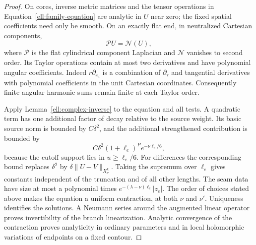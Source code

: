 \begin{proof}
On cores, inverse metric matrices and the tensor operations in
Equation~\eqref{ell:family-equation} are analytic in $U$ near zero;
the fixed spatial coefficients need only be smooth.  On an
exactly flat end, in neutralized Cartesian components,
\begin{equation}
                   \mathcal P U=\mathcal N(U),
 \label{ell:flat-equation}
\end{equation}
where $\mathcal P$ is the flat cylindrical component Laplacian
and $\mathcal N$ vanishes to second order.  Its Taylor operations
contain at most two derivatives and have polynomial angular
coefficients.  Indeed $r\partial_{x_i}$ is a combination of
$\partial_\tau$ and tangential derivatives with polynomial
coefficients in the unit Cartesian coordinates.  Consequently
finite angular harmonic sums remain finite at each Taylor order.

Apply Lemma~\ref{ell:complex-inverse} to the equation and all
tests.  A quadratic term has one additional factor of decay
relative to the source weight.  Its basic source norm is
bounded by $C\delta^2$, and the additional strengthened
contribution is bounded by
\[
 C\delta^2(1+\ell_e)^P e^{-\nu\ell_e/6},
\]
because the cutoff support lies in $u\ge\ell_e/6$.
For differences the corresponding bound replaces $\delta^2$
by $\delta\|U-V\|_{X^k_\nu}$.  Taking the supremum over
$\ell_e$ gives constants independent of the truncation and
of all other lengths.
The seam data have size at most a polynomial times
$e^{-(\lambda-\nu)\ell_e}|z_e|$.  The order of choices stated
above makes the equation a uniform contraction, at both $\nu$
and $\nu'$.  Uniqueness identifies the solutions.  A Neumann
series around the augmented linear operator proves invertibility
of the branch linearization.  Analytic convergence of the
contraction proves analyticity in ordinary parameters and in
local holomorphic variations of endpoints on a fixed contour.


\end{proof}
